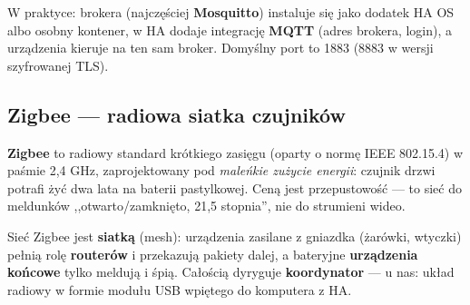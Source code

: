 \documentclass[11pt,a4paper]{article}
\begin{document}
W praktyce: brokera (najczęściej \textbf{Mosquitto}) instaluje się jako dodatek HA OS albo osobny kontener, w HA dodaje integrację \textbf{MQTT} (adres brokera, login), a urządzenia kieruje na ten sam broker. Domyślny port to 1883 (8883 w wersji szyfrowanej TLS).

\subsection{Zigbee --- radiowa siatka czujników}
\label{sec:zigbee}

\textbf{Zigbee} to radiowy standard krótkiego zasięgu (oparty o normę IEEE 802.15.4) w paśmie 2,4 GHz, zaprojektowany pod \emph{maleńkie zużycie energii}: czujnik drzwi potrafi żyć dwa lata na baterii pastylkowej. Ceną jest przepustowość --- to sieć do meldunków ,,otwarto/zamknięto, 21,5 stopnia'', nie do strumieni wideo.

Sieć Zigbee jest \textbf{siatką} (mesh): urządzenia zasilane z gniazdka (żarówki, wtyczki) pełnią rolę \textbf{routerów} i przekazują pakiety dalej, a bateryjne \textbf{urządzenia końcowe} tylko meldują i śpią. Całością dyryguje \textbf{koordynator} --- u nas: układ radiowy w formie modułu USB wpiętego do komputera z HA.

\begin{center}
\end{center}
\end{document}
